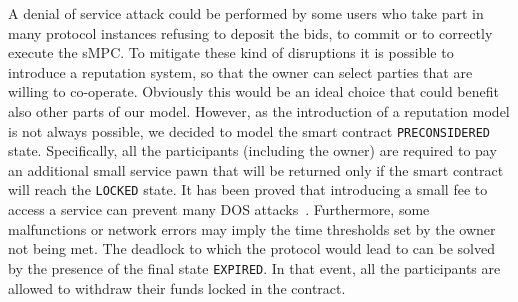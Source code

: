 A denial of service attack could be performed by some users who take part in many \shortname protocol instances refusing to deposit the bids, to commit or to correctly execute the sMPC. 
To mitigate these kind of disruptions it is possible to introduce a reputation system, so that the owner can select parties that are willing to co-operate. 
Obviously this would be an ideal choice that could benefit also other parts of our model. However, as the introduction of a reputation model is not always possible, we decided to model the smart contract \texttt{PRE\textunderscore CONSIDERED} state. 
Specifically, all the participants (including the owner) are required to pay an additional small service pawn that will be returned only if the smart contract will reach the \texttt{LOCKED} state. 
It has been proved that introducing a small fee to access a service can prevent many DOS attacks~\cite{ddos-payments,ddos-survey}. 
Furthermore, some malfunctions or network errors may imply the time thresholds set by the owner not being met.
The deadlock to which the protocol would lead to can be solved by the presence of the final state \texttt{EXPIRED}. 
In that event, all the participants are allowed to withdraw their funds locked in the contract.  